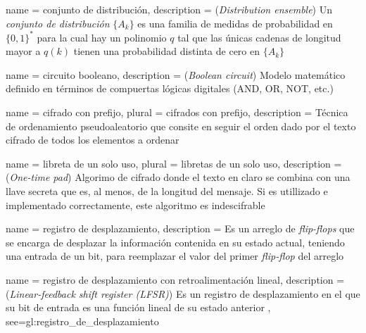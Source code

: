 {
  name = conjunto de distribución,
  description = {
    (\textit{Distribution ensemble}) Un \textit{conjunto de distribución}
    $ \{ A_k \} $ es una familia de medidas de probabilidad en $ \{0, 1\}^* $
    para la cual hay un polinomio $ q $ tal que las únicas cadenas de longitud
    mayor a $ q(k) $ tienen una probabilidad distinta de cero en
    $ \{ A_k \} $~\cite{DBLP:conf/stoc/BeaverMR90}%
  }
}

{
  name = circuito booleano,
  description = {
    (\textit{Boolean circuit}) Modelo matemático definido en términos de
    compuertas lógicas digitales (AND, OR, NOT, etc.)%
  }
}

{
  name = cifrado con prefijo,
  plural = cifrados con prefijo,
  description = {
    Técnica de ordenamiento pseudoaleatorio que consite en seguir el orden dado
    por el texto cifrado de todos los elementos a ordenar%
  }
}

{
  name = libreta de un solo uso,
  plural = libretas de un solo uso,
  description = {
    (\textit{One-time pad}) Algorimo de cifrado donde el texto en claro se combina
    con una llave secreta que es, al menos, de la longitud del mensaje. Si es
    utillizado e implementado correctamente, este algoritmo es indescifrable%
  }
}

{
  name = registro de desplazamiento,
  description = {
    Es un arreglo de \textit{flip-flops} que se encarga de desplazar la
    información contenida en su estado actual, teniendo una entrada de un
    bit, para reemplazar el valor del primer \textit{flip-flop} del arreglo%
  }
}

{
  name = registro de desplazamiento con retroalimentación lineal,
  description = {
    (\textit{Linear-feedback shift register (LFSR)}) Es un registro de
    desplazamiento en el que su bit de entrada es una función lineal de su
    estado anterior%
  },
  see={gl:registro_de_desplazamiento}
}

\glsaddall
